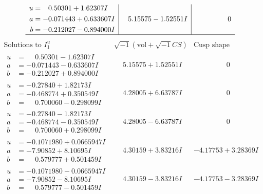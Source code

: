 \documentclass[1p]{elsarticle_modified}
\theoremstyle{definition}
\newcommand{\I}{\sqrt{-1}}
\begin{document}
$$\begin{array}{c|c|c}
\begin{aligned}
u &= \phantom{-}0.50301 + 1.62307 I \\
a &= -0.071443 + 0.633607 I \\
b &= -0.212027 - 0.894000 I\end{aligned}
 & \phantom{-}5.15575 - 1.52551 I & \phantom{-0.000000 } 0\\
 \hline 
 \end{array}$$\newpage$$\begin{array}{c|c|c}  
\text{Solutions to }I^u_{1}& \I (\text{vol} + \sqrt{-1}CS) & \text{Cusp shape}\\
 \hline 
\begin{aligned}
u &= \phantom{-}0.50301 - 1.62307 I \\
a &= -0.071443 - 0.633607 I \\
b &= -0.212027 + 0.894000 I\end{aligned}
 & \phantom{-}5.15575 + 1.52551 I & \phantom{-0.000000 } 0 \\ \hline\begin{aligned}
u &= -0.27840 + 1.82173 I \\
a &= -0.468774 + 0.350549 I \\
b &= \phantom{-}0.700060 - 0.298099 I\end{aligned}
 & \phantom{-}4.28005 + 6.63787 I & \phantom{-0.000000 } 0 \\ \hline\begin{aligned}
u &= -0.27840 - 1.82173 I \\
a &= -0.468774 - 0.350549 I \\
b &= \phantom{-}0.700060 + 0.298099 I\end{aligned}
 & \phantom{-}4.28005 - 6.63787 I & \phantom{-0.000000 } 0 \\ \hline\begin{aligned}
u &= -0.1071980 + 0.0665947 I \\
a &= -7.90852 + 8.10695 I \\
b &= \phantom{-}0.579777 + 0.501459 I\end{aligned}
 & \phantom{-}4.30159 + 3.83216 I & -4.17753 + 3.28369 I \\ \hline\begin{aligned}
u &= -0.1071980 - 0.0665947 I \\
a &= -7.90852 - 8.10695 I \\
b &= \phantom{-}0.579777 - 0.501459 I\end{aligned}
 & \phantom{-}4.30159 - 3.83216 I & -4.17753 - 3.28369 I \\ \hline\begin{aligned}

\end{aligned}
\end{array}$$
\end{document}

